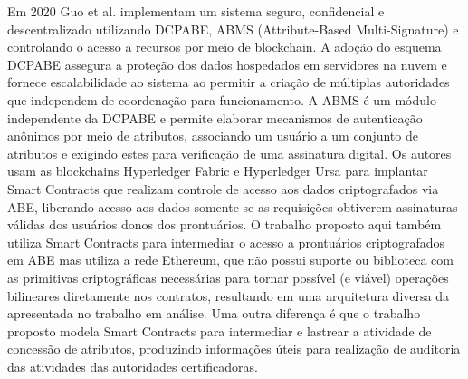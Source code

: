 \documentclass[a4paper,11pt]{article}
\begin{document}
Em 2020 Guo et al. \cite{Guo2020} implementam um sistema seguro, confidencial e descentralizado utilizando DCPABE, ABMS (Attribute-Based Multi-Signature) e controlando o acesso a recursos por meio de blockchain.
A adoção do esquema DCPABE assegura a proteção dos dados hospedados em servidores na nuvem e fornece escalabilidade ao sistema ao permitir a criação de múltiplas autoridades que independem de coordenação para funcionamento.
A ABMS é um módulo independente da DCPABE e permite elaborar mecanismos de autenticação anônimos por meio de atributos, associando um usuário a um conjunto de atributos e exigindo estes para verificação de uma assinatura digital.
Os autores usam as blockchains Hyperledger Fabric e Hyperledger Ursa para implantar Smart Contracts que realizam controle de acesso aos dados criptografados via ABE, liberando acesso aos dados somente se as requisições obtiverem assinaturas válidas dos usuários donos dos prontuários.
O trabalho proposto aqui também utiliza Smart Contracts para intermediar o acesso a prontuários criptografados em ABE mas utiliza a rede Ethereum, que não possui suporte ou biblioteca com as primitivas criptográficas necessárias para tornar possível (e viável) operações bilineares diretamente nos contratos, resultando em uma arquitetura diversa da apresentada no trabalho em análise.
Uma outra diferença é que o trabalho proposto modela Smart Contracts para intermediar e lastrear a atividade de concessão de atributos, produzindo informações úteis para realização de auditoria das atividades das autoridades certificadoras.
\end{document}
